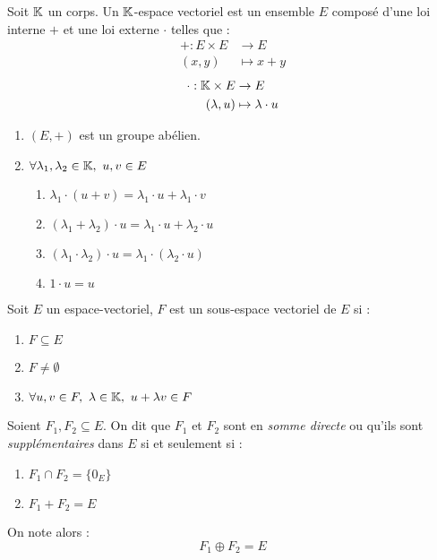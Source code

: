 \begin{definition}
	Soit $\mathbb{K}$ un corps. Un $\mathbb{K}$-espace vectoriel est un ensemble $E$ composé d'une loi interne \og $+$ \fg et une loi externe \og $\cdot$ \fg telles que :
	\begin{align*}
		+ : E \times E &\to E \\
		(x, y) &\mapsto x + y
	\end{align*}
	\begin{align*}
		\cdot : \mathbb{K} \times E &\to E \\
		(\lambda, u) &\mapsto \lambda \cdot u
	\end{align*}
	\begin{enumerate}
		\item $(E, +)$ est un groupe abélien.
		\item $\forall \lambda_1, \lambda_2 \in \K,\ u, v \in E$
		\begin{multicols}{2}
            \begin{enumerate}
			\item $\lambda_1 \cdot (u + v) = \lambda_1 \cdot u + \lambda_1 \cdot v$
			\item $(\lambda_1 + \lambda_2) \cdot u = \lambda_1 \cdot u + \lambda_2 \cdot u$
			\item $(\lambda_1 \cdot \lambda_2) \cdot u = \lambda_1 \cdot (\lambda_2 \cdot u)$
			\item $1 \cdot u = u$
		\end{enumerate}
        \end{multicols}
	\end{enumerate}
\end{definition}

\begin{definition}
	Soit $E$ un espace-vectoriel, $F$ est un sous-espace vectoriel de $E$ si :
	\begin{multicols}{2}
	    \begin{enumerate}
    		\item $F \subseteq E$
    		\item $F \neq \emptyset$
    		\item $\forall u, v \in F,\ \lambda \in \K,\ u + \lambda v \in F$
    	\end{enumerate}
	\end{multicols}
\end{definition}

\begin{definition}
	Soient $F_1, F_2 \subseteq E$. On dit que $F_1$ et $F_2$ sont en \emph{somme directe} ou qu'ils sont \emph{supplémentaires} dans $E$ si et seulement si :
	\begin{multicols}{2}
	    \begin{enumerate}
		\item $F_1 \cap F_2 = \{ 0_E \}$
		\item $F_1 + F_2 = E$
	\end{enumerate}
	\end{multicols}
	On note alors :
	\[ F_1 \oplus F_2 = E \]
\end{definition}

